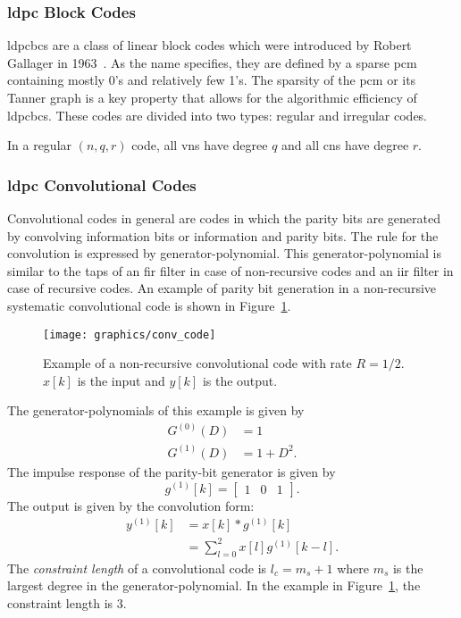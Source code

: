 \subsubsection{\acl{ldpc} Block Codes}
\acp{ldpcbc} are a class of linear block codes which were introduced by Robert Gallager in 1963~\cite{Gallager1963}. As the name specifies, they are defined by a sparse \ac{pcm} containing mostly 0's and relatively few 1's. The sparsity of the \ac{pcm} or its Tanner graph is a key property that allows for the algorithmic efficiency of \acp{ldpcbc}. These codes are divided into two types: regular and irregular codes.

In a regular $(n,q,r)$ code, all \acp{vn} have degree $q$ and all \acp{cn} have degree $r$.

\subsubsection{\acl{ldpc} Convolutional Codes}
Convolutional codes in general are codes in which the parity bits are generated by convolving information bits or information and parity bits. The rule for the convolution is expressed by generator-polynomial. This generator-polynomial is similar to the taps of an \ac{fir} filter in case of non-recursive codes and an \ac{iir} filter in case of recursive codes. An example of parity bit generation in a non-recursive systematic convolutional code is shown in Figure~\ref{fig:conv_code}.
\begin{figure}[htbp]
  \centering
  \texttt{[image: graphics/conv\_code]}
  \caption{Example of a non-recursive convolutional code with rate $R=1/2$. $x[k]$ is the input and $y[k]$ is the output.}
  \label{fig:conv_code}
\end{figure}
The generator-polynomials of this example is given by
\begin{align*}
G^{(0)}(D)&=1\\
G^{(1)}(D)&=1+D^2.
\end{align*}
The impulse response of the parity-bit generator is given by
$$g^{(1)}[k]=\begin{bmatrix}
1 &0 &1
\end{bmatrix}.$$
The output is given by the convolution form:
\begin{align}
y^{(1)}[k]&=x[k]*g^{(1)}[k]\nonumber\\
&=\sum_{l=0}^{2}x[l]g^{(1)}[k-l].
\end{align}
The \emph{constraint length} of a convolutional code is $l_c=m_s+1$ where $m_s$ is the largest degree in the generator-polynomial. In the example in Figure~\ref{fig:conv_code}, the constraint length is 3.

